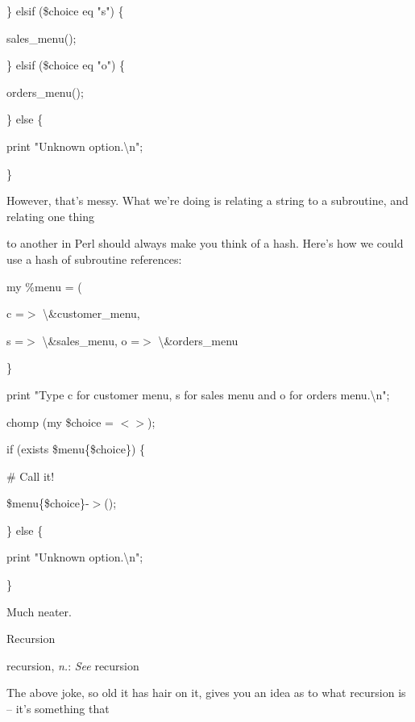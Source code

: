 \documentclass[a4paper,11pt]{book}
\begin{document}
\noindent \} elsif (\$choice eq "s") \{

\noindent sales\_menu();

\noindent \} elsif (\$choice eq "o") \{

\noindent orders\_menu();

\noindent \} else \{

\noindent print "Unknown option.\textbackslash n";

\noindent \}

\noindent 

\noindent However,  that's messy. What  we're doing  is  relating  a  string  to  a  subroutine,  and  relating  one  thing

\noindent to  another in Perl should always  make  you  think  of  a  hash.  Here's  how  we  could  use a  hash of subroutine references:

\noindent 

\noindent my \%menu = (

\noindent c =$>$ \textbackslash \&customer\_menu,

\noindent s =$>$ \textbackslash \&sales\_menu, o =$>$ \textbackslash \&orders\_menu

\noindent \}

\noindent print "Type c for customer menu, s for sales menu and o for orders menu.\textbackslash n";

\noindent chomp (my \$choice = $<$$>$);

\noindent if (exists \$menu\{\$choice\}) \{

\noindent \# Call it!

\noindent \$menu\{\$choice\}-$>$();

\noindent \} else \{

\noindent print "Unknown option.\textbackslash n";

\noindent \}

\noindent 

\noindent Much neater.

\noindent 

\noindent 

\noindent Recursion

\noindent 

\noindent recursion, \textit{n.}: \textit{See }recursion

\noindent 

\noindent 

\noindent The above joke, so old it has hair on it, gives you an idea as to what recursion is -- it's something that
\end{document}
